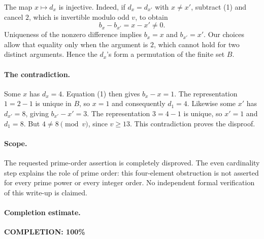 The map \(x\mapsto d_x\) is injective.
Indeed, if \(d_x=d_{x'}\) with \(x\ne x'\), subtract (1) and
cancel \(2\), which is invertible modulo odd \(v\), to obtain
\[
 b_x-b_{x'}=x-x'\ne0.
\]
Uniqueness of the nonzero difference implies
\(b_x=x\) and \(b_{x'}=x'\).
Our choices allow that equality only when the argument is \(2\),
which cannot hold for two distinct arguments.
Hence the \(d_x\)'s form a permutation of the finite set \(B\).

\paragraph{The contradiction.}
Some \(x\) has \(d_x=4\). Equation (1) then gives \(b_x-x=1\).
The representation \(1=2-1\) is unique in \(B\), so \(x=1\)
and consequently \(d_1=4\).
Likewise some \(x'\) has \(d_{x'}=8\), giving \(b_{x'}-x'=3\).
The representation \(3=4-1\) is unique, so \(x'=1\) and
\(d_1=8\). But \(4\ne8\pmod v\), since \(v\geq13\).
This contradiction proves the disproof.

\paragraph{Scope.}
The requested prime-order assertion is completely disproved.
The even cardinality step explains the role of prime order:
this four-element obstruction is not asserted for every prime
power or every integer order. No independent formal verification
of this write-up is claimed.

\paragraph{Completion estimate.}
\textbf{COMPLETION: 100\%}
